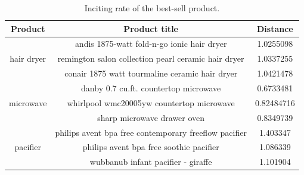 \documentclass[12pt]{article}%
\begin{document}
\begin{table}[H]
	\centering
	\caption{Inciting rate of the best-sell product.}	
	\begin{tabular}{c|cc}
		\toprule[1.5pt]
		\multicolumn{1}{m{2cm}}{\centering Product} &
		\multicolumn{1}{m{9cm}}{\centering Product title} & \multicolumn{1}{m{2cm}}{\centering Distance}\\
		\midrule[1pt]
		&andis 1875-watt fold-n-go ionic hair dryer &1.0255098\\
		hair dryer&remington salon collection pearl ceramic hair dryer     & 1.0337255\\
		&conair 1875 watt tourmaline ceramic hair dryer          &1.0421478\\
		\midrule[1pt]
		&danby 0.7 cu.ft. countertop microwave          & 0.6733481\\
		microwave&whirlpool wmc20005yw  countertop microwave          &0.82484716\\
		&sharp microwave drawer oven        &0.8349739\\
		\midrule[1pt]
		&philips avent bpa free contemporary freeflow pacifier        &1.403347\\
		pacifier&philips avent bpa free soothie pacifier       &1.086339\\
		&wubbanub infant pacifier - giraffe&1.101904\\
		\bottomrule[1.6pt]
	\end{tabular}
\end{table}
\end{document}
